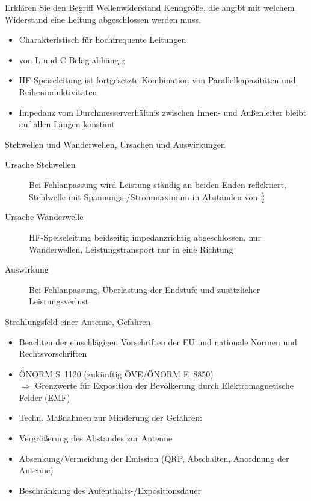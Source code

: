 \documentclass[avery5371,grid,frame,a4paper]{flashcards}
\newcommand{\card}[3]{
  \begin{flashcard}[{\chap} -- #1]{#2}#3\end{flashcard}
}
\begin{document}
\card{71}{Erklären Sie den Begriff Wellenwiderstand}{
  \small
  Kenngröße, die angibt mit welchem Widerstand eine Leitung abgeschlossen werden muss.

  \begin{itemize}
    \item Charakteristisch für hochfrequente Leitungen
    \item von L und C Belag abhängig
    \item HF-Speiseleitung ist fortgesetzte Kombination von Parallelkapazitäten und Reiheninduktivitäten
    \item Impedanz vom Durchmesserverhältnis zwischen Innen- und Außenleiter bleibt auf allen Längen konstant
  \end{itemize}
}
\card{72}{Stehwellen und Wanderwellen, Ursachen und Auswirkungen}{
  \small
  \begin{description}
    \item[Ursache Stehwellen]
      Bei Fehlanpassung wird Leistung ständig an beiden Enden reflektiert,
      Stehlwelle mit Spannungs-/Strommaximum in Abständen von $\frac\lambda2$
    \item[Ursache Wanderwelle]
      HF-Speiseleitung beidseitig impedanzrichtig abgeschlossen,
      nur Wanderwellen, Leistungstransport nur in eine Richtung
    \item[Auswirkung]
      Bei Fehlanpassung, Überlastung der Endstufe und zusätzlicher Leistungsverlust
  \end{description}
}
\card{73}{Strahlungsfeld einer Antenne, Gefahren}{
  \small
  \begin{itemize} 
    \item Beachten der einschlägigen Vorschriften der EU und nationale Normen und Rechtsvorschriften
    \item ÖNORM S~1120 (zukünftig ÖVE/ÖNORM E~8850) \\
          $\Rightarrow$ Grenzwerte für Exposition der Bevölkerung durch Elektromagnetische Felder (EMF)
    \item Techn. Maßnahmen zur Minderung der Gefahren:
  \end{itemize}
  \begin{itemize}[label=*] 
    \item Vergrößerung des Abstandes zur Antenne %
    \item Absenkung/Vermeidung der Emission (QRP, Abschalten, Anordnung der Antenne)
    \item Beschränkung des Aufenthalts-/Expositionsdauer
  \end{itemize}
}
\end{document}
